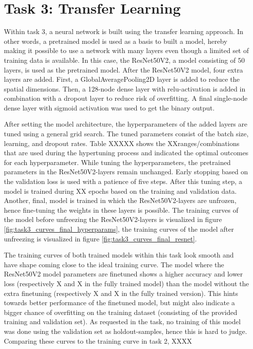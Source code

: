 \documentclass[conference]{IEEEtran}
\begin{document}
\section{Task 3: Transfer Learning}\label{sec:task_3}


Within task 3, a neural network is built using the transfer learning approach. In other words, a pretrained model is used as a basis to built a model, hereby making it possible to use a network with many layers even though a limited set of training data is available. 
In this case, the ResNet50V2, a model consisting of 50 layers, is used as the pretrained model. After the ResNet50V2 model, four extra layers are added. First, a GlobalAveragePooling2D layer is added to reduce the spatial dimensions. Then, a 128-node dense layer with relu-activation is added in combination with a dropout layer to reduce risk of overfitting. A final single-node dense layer with sigmoid activation was used to get the binary output.

After setting the model architecture, the hyperparameters of the added layers are tuned using a general grid search. The tuned parameters consist of the  batch size, learning, and dropout rates. Table XXXXX shows the XXranges/combinations that are used during the hypertuning process and indicated the optimal outcomes for each hyperparameter. 
While tuning the hyperparameters, the pretrained parameters in the ResNet50V2-layers remain unchanged. Early stopping based on the validation loss is used with a patience of five steps. After this tuning step, a model is trained during XX epochs based on the training and validation data. 
Another, final, model is trained in which the ResNet50V2-layers are unfrozen, hence fine-tuning the weights in these layers is possible. The training curves of the model before unfreezing the ResNet50V2-layers is visualized in figure \ref{fig:task3_curves_final_hyperparams}, the training curves of the model after unfreezing is visualized in figure \ref{fig:task3_curves_final_resnet}.

The training curves of both trained models within this task look smooth and have shape coming close to the ideal training curve. 
The model where the ResNet50V2 model parameters are finetuned shows a higher accuracy and lower loss (respectively X and X in the fully trained model) than the model without the extra finetuning (respectively X and X in the fully trained version).
This hints towards better performance of the finetuned model, but might also indicate a bigger chance of overfitting on the training dataset (consisting of the provided training and validation set). As requested in the task, no training of this model was done using the validation set as holdout-samples, hence this is hard to judge.
Comparing these curves to the training curve in task 2, XXXX
\end{document}
